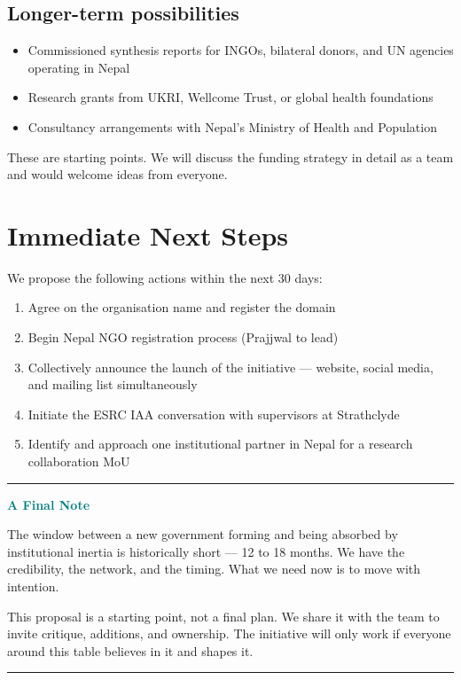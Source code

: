 \documentclass[11pt, a4paper]{article}
\begin{document}
\subsection*{Longer-term possibilities}

\begin{itemize}
  \item Commissioned synthesis reports for INGOs, bilateral donors, and UN agencies operating in Nepal
  \item Research grants from UKRI, Wellcome Trust, or global health foundations
  \item Consultancy arrangements with Nepal's Ministry of Health and Population
\end{itemize}

These are starting points. We will discuss the funding strategy in detail as a team and would welcome ideas from everyone.

\section{Immediate Next Steps}

We propose the following actions within the next 30 days:

\begin{enumerate}
  \item Agree on the organisation name and register the domain
  \item Begin Nepal NGO registration process (Prajjwal to lead)
  \item Collectively announce the launch of the initiative --- website, social media, and mailing list simultaneously
  \item Initiate the ESRC IAA conversation with supervisors at Strathclyde
  \item Identify and approach one institutional partner in Nepal for a research collaboration MoU
\end{enumerate}

\vspace{1.5em}
\textcolor{teal}{\rule{\linewidth}{0.6pt}}
\vspace{0.4em}

\textbf{\textcolor{teal}{A Final Note}}

\medskip
The window between a new government forming and being absorbed by institutional inertia is historically short --- 12 to 18 months. We have the credibility, the network, and the timing. What we need now is to move with intention.

This proposal is a starting point, not a final plan. We share it with the team to invite critique, additions, and ownership. The initiative will only work if everyone around this table believes in it and shapes it.

\vspace{0.4em}
\textcolor{teal}{\rule{\linewidth}{0.6pt}}
\end{document}
